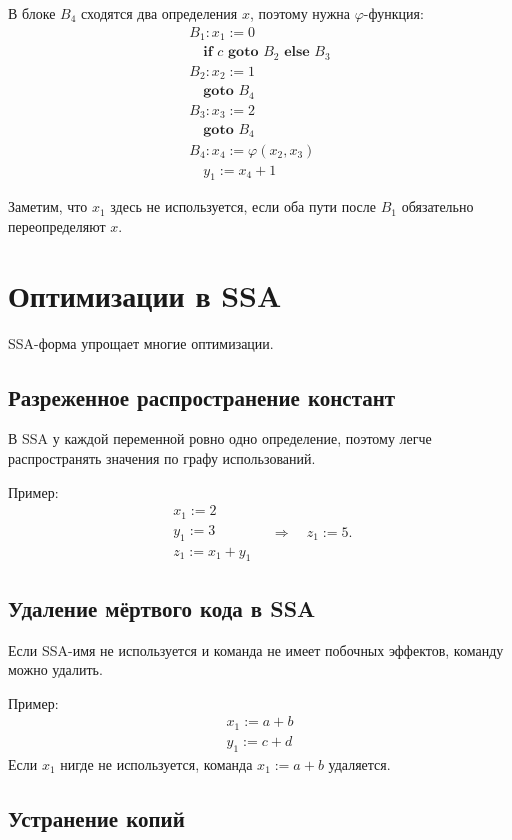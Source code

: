\documentclass[12pt,a4paper]{article}
\begin{document}
В блоке $B_4$ сходятся два определения $x$, поэтому нужна $\varphi$-функция:
\[
\begin{array}{l}
B_1: x_1:=0\\
\quad \textbf{if } c \textbf{ goto } B_2 \textbf{ else } B_3\\[2mm]
B_2: x_2:=1\\
\quad \textbf{goto } B_4\\[2mm]
B_3: x_3:=2\\
\quad \textbf{goto } B_4\\[2mm]
B_4: x_4:=\varphi(x_2,x_3)\\
\quad y_1:=x_4+1
\end{array}
\]

Заметим, что $x_1$ здесь не используется, если оба пути после $B_1$ обязательно переопределяют $x$.

\section{Оптимизации в SSA}

SSA-форма упрощает многие оптимизации.

\subsection{Разреженное распространение констант}

В SSA у каждой переменной ровно одно определение, поэтому легче распространять значения по графу использований.

Пример:
\[
\begin{array}{l}
x_1:=2\\
y_1:=3\\
z_1:=x_1+y_1
\end{array}
\quad \Rightarrow \quad
z_1:=5.
\]

\subsection{Удаление мёртвого кода в SSA}

Если SSA-имя не используется и команда не имеет побочных эффектов, команду можно удалить.

Пример:
\[
\begin{array}{l}
x_1:=a+b\\
y_1:=c+d
\end{array}
\]
Если $x_1$ нигде не используется, команда $x_1:=a+b$ удаляется.

\subsection{Устранение копий}
\end{document}
